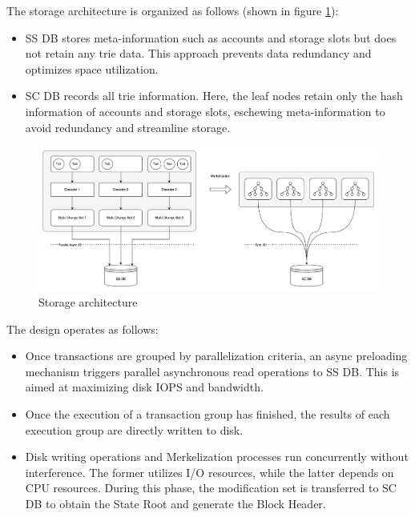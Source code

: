 The storage architecture is organized as follows (shown in figure \ref{fig:sc_ss_separation}):

\begin{itemize}
    \item SS DB stores meta-information such as accounts and storage slots but does not retain any trie data. This approach prevents data redundancy and optimizes space utilization.
    \item SC DB records all trie information. Here, the leaf nodes retain only the hash information of accounts and storage slots, eschewing meta-information to avoid redundancy and streamline storage.
\end{itemize}

\begin{figure}[htp]
    \centering
    \includegraphics[width=\textwidth]{sections/images/sc-ss-separation.png}
    \caption{Storage architecture}
    \label{fig:sc_ss_separation}
\end{figure}

The design operates as follows:

\begin{itemize}
    \item Once transactions are grouped by parallelization criteria, an async preloading mechanism triggers parallel asynchronous read operations to SS DB. This is aimed at maximizing disk IOPS and bandwidth.
    \item Once the execution of a transaction group has finished, the results of each execution group are directly written to disk.
    \item Disk writing operations and Merkelization processes run concurrently without interference. The former utilizes I/O resources, while the latter depends on CPU resources. During this phase, the modification set is transferred to SC DB to obtain the State Root and generate the Block Header.
\end{itemize}

